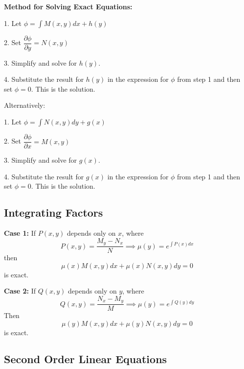 \documentclass[10pt,portrait, leqno]{article}
\begin{document}
\begin{multicols}{2}
\textbf{Method for Solving Exact Equations:}

1. Let $\phi=\int M(x,y)dx + h(y)$

2. Set $\dfrac{\partial \phi}{\partial y} = N(x,y)$

3. Simplify and solve for $h(y)$. 

4. Substitute the result for $h(y)$ in the expression for $\phi$ from step 1 and then set $\phi=0$. This is the solution. 

Alternatively: 

1. Let $\phi=\int N(x,y)dy + g(x)$

2. Set $\dfrac{\partial \phi}{\partial x} = M(x,y)$

3. Simplify and solve for $g(x)$. 

4. Substitute the result for $g(x)$ in the expression for $\phi$ from step 1 and then set $\phi=0$. This is the solution. 

\subsection*{Integrating Factors}
\textbf{Case 1:} If $P(x,y)$ depends only on $x$, where
\begin{equation}
P(x,y)=\dfrac{M_y-N_x}{N} \implies \mu(y) = e^{\int P(x)dx}
\end{equation}
then
\begin{equation}
\mu(x) M(x,y) dx + \mu(x) N(x,y) dy = 0
\end{equation}
is exact.

\textbf{Case 2:} If $Q(x,y)$ depends only on $y$, where
\begin{equation}
Q(x,y)=\dfrac{N_x-M_y}{M} \implies \mu(y) = e^{\int Q(y)dy}
\end{equation}
Then 
\begin{equation}
\mu(y) M(x,y) dx + \mu(y)N(x,y) dy =0
\end{equation}
is exact.

\end{multicols}

\newpage

 \begin{center}\section*{Second Order Linear Equations}
\end{center}
\end{document}
